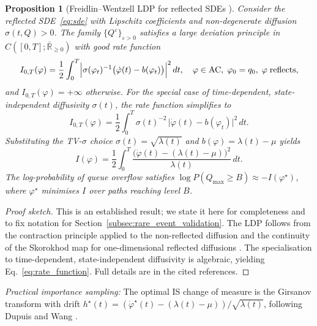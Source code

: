 \documentclass[journal]{IEEEtran}
\newtheorem{proposition}[theorem]{Proposition}
\begin{document}
\begin{proposition}[Freidlin--Wentzell LDP for reflected SDEs {\cite{dupuis1997large,xu2009large}}]
\label{prop:rate_function}
Consider the reflected SDE~\eqref{eq:sde} with Lipschitz coefficients and non-degenerate
diffusion $\sigma(t,Q)>0$. The family $\{Q^\varepsilon\}_{\varepsilon>0}$ satisfies a large
deviation principle in $C([0,T];\bar{\mathbb{R}}_{\geq0})$ with good rate function
\begin{equation}
    I_{0,T}(\varphi) = \frac{1}{2}\int_0^T
    \Bigl|\sigma(\varphi_t)^{-1}\bigl(\dot\varphi(t)-b(\varphi_t)\bigr)\Bigr|^2\,dt,
    \quad \varphi\in\mathrm{AC},\;\varphi_0=q_0,\;\varphi\;\text{reflects},
    \label{eq:rate_general}
\end{equation}
and $I_{0,T}(\varphi)=+\infty$ otherwise. For the special case of time-dependent,
state-independent diffusivity $\sigma(t)$, the rate function simplifies to
\begin{equation}
    I_{0,T}(\varphi) = \frac{1}{2}\int_0^T
    \sigma(t)^{-2}\,\bigl|\dot\varphi(t)-b(\varphi_t)\bigr|^2\,dt .
    \label{eq:rate_si}
\end{equation}
Substituting the TV-$\sigma$ choice $\sigma(t)=\sqrt{\lambda(t)}$ and
$b(\varphi)=\lambda(t)-\mu$ yields
\begin{equation}
    I(\varphi) = \frac{1}{2}\int_0^T
    \frac{\bigl(\dot\varphi(t)-(\lambda(t)-\mu)\bigr)^2}{\lambda(t)}\,dt .
    \label{eq:rate_function}
\end{equation}
The log-probability of queue overflow satisfies
$\log P(Q_{\max}\geq B)\approx -I(\varphi^\star)$, where $\varphi^\star$ minimises $I$ over
paths reaching level $B$.
\end{proposition}
\begin{proof}[Proof sketch]
This is an established result; we state it here for completeness and to fix notation for
Section~\ref{subsec:rare_event_validation}. The LDP follows from the contraction principle applied to
the non-reflected diffusion and the continuity of the Skorokhod map for
one-dimensional reflected diffusions \cite{xu2009large,dupuis1997large}.
The specialisation to time-dependent, state-independent diffusivity is algebraic,
yielding Eq.~\eqref{eq:rate_function}. Full details are in the cited references.
\end{proof}

\textit{Practical importance sampling:}
The optimal IS change of measure is the Girsanov transform with drift
$h^\star(t)=(\dot\varphi^\star(t)-(\lambda(t)-\mu))/\sqrt{\lambda(t)}$, following Dupuis and
Wang \cite{dupuis2007dynamic}.
\end{document}
